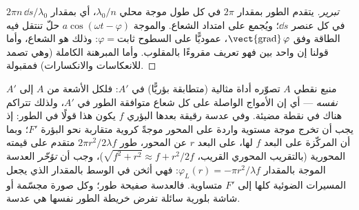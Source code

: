 \begin{proof}[تبرير]
يتقدم الطور بمقدار $2\pi$ في كل طول موجة محلي $\lambda_0/n$، أي بمقدار
$2\pi n\,\dd s/\lambda_0$ في كل عنصر $\dd s$؛ ويُجمع على امتداد الشعاع. والموجة
$a\cos(\omega t - \varphi)$ حلّ  تنتقل فيه
الطاقة وفق $\operatorname{\vect{grad}}\varphi$، عموديًّا على
السطوح $\varphi = \text{ثابت}$: وذلك هو الشعاع، وأما قولنا إن  واحد
بين  فهو تعريف 
مقروءًا بالمقلوب. وأما المبرهنة الكاملة (وهي تصمد للانعكاسات
والانكسارات) فمقبولة.
\end{proof}

\begin{example}\label{ex:b2:scalar-light-model:lens}
منبع نقطي $A$ تصوّره أداة مثالية (متطابقة بؤريًّا) في $A'$:
فلكل الأشعة من $A$ إلى $A'$ \emph{ نفسه} --- أي إن
الأمواج الواصلة على كل شعاع متوافقة الطور في $A'$، ولذلك
تتراكم هناك في نقطة مضيئة. وفي عدسة رقيقة بعدها البؤري $f$
يكون هذا قولًا في الطور: إذ يجب أن تخرج موجة مستوية واردة على المحور
موجةً كروية متقاربة نحو البؤرة $F'$؛ وبما أن 
المركّزة على البعد $f$ لها، على البعد $r$ عن المحور،
طور $2\pi r^2/2\lambda f$ متقدم على قيمته المحورية (بالتقريب المحوري
القريب، $\sqrt{f^2 + r^2} \approx f + r^2/2f$)، وجب أن \emph{تؤخّر}
العدسة الموجة بالمقدار $\varphi_L(r) = -\pi r^2/\lambda f$: فهي أثخن في
الوسط بالمقدار الذي يجعل المسيرات الضوئية كلها إلى $F'$
متساوية. فالعدسة صفيحة طور؛ وكل صورة مجسّمة أو شاشة بلورية سائلة
تفرض خريطة الطور نفسها هي عدسة.
\end{example}

